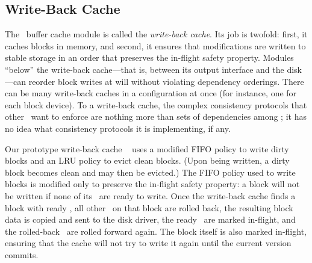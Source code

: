 
\subsection{Write-Back Cache}
\label{sec:modules:wbcache}

The \Kudos\ buffer cache module is called the \emph{write-back cache}.
%
Its job is twofold: first, it caches blocks in memory, and second, it
ensures that modifications are written to stable storage in an order that
preserves the in-flight safety property.
%
Modules ``below'' the write-back cache---that is, between its output
interface and the disk---can reorder block writes at will without violating
dependency orderings.
%
There can be many write-back caches in a configuration at once (for
instance, one for each block device). To a write-back cache, the complex
consistency protocols that other \modules\ want to enforce are nothing more
than sets of dependencies among \chdescs; it has no idea what consistency
protocols it is implementing, if any.

Our prototype write-back cache \module\ 
%
uses a modified FIFO policy to write dirty blocks and an LRU policy to
evict clean blocks.  (Upon being written, a dirty block becomes clean and
may then be evicted.)
%
The FIFO policy used to write blocks is modified only to preserve the
in-flight safety property: a block will not be written if none of its
\patches\ are ready to write.
%
Once the write-back cache finds a block with ready \chdescs, all other
\chdescs\ on that block are rolled back, the resulting block data is copied
and sent to the disk driver, the ready \chdescs\ are marked in-flight, and
the rolled-back \chdescs\ are rolled forward again.
%
The block itself is also marked in-flight, ensuring that the cache will not
try to write it again until the current version commits.


